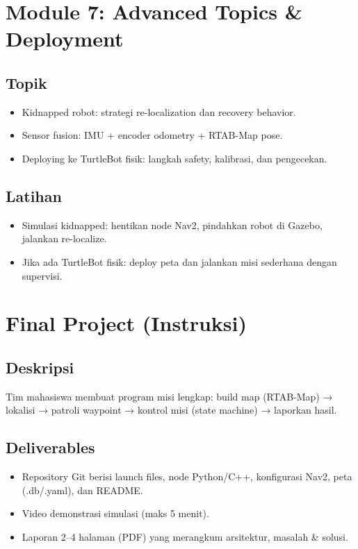 \documentclass[12pt,a4paper]{article}
\begin{document}
\newpage
\section{Module 7: Advanced Topics \& Deployment}
\subsection*{Topik}
\begin{itemize}
    \item Kidnapped robot: strategi re-localization dan recovery behavior.
    \item Sensor fusion: IMU + encoder odometry + RTAB-Map pose.
    \item Deploying ke TurtleBot fisik: langkah safety, kalibrasi, dan pengecekan.
\end{itemize}

\subsection*{Latihan}
\begin{itemize}
    \item Simulasi kidnapped: hentikan node Nav2, pindahkan robot di Gazebo, jalankan re-localize.
    \item Jika ada TurtleBot fisik: deploy peta dan jalankan misi sederhana dengan supervisi.
\end{itemize}

\newpage
\section{Final Project (Instruksi)}
\subsection*{Deskripsi}
Tim mahasiswa membuat program misi lengkap: build map (RTAB-Map) → lokalisi → patroli waypoint → kontrol misi (state machine) → laporkan hasil.

\subsection*{Deliverables}
\begin{itemize}
    \item Repository Git berisi launch files, node Python/C++, konfigurasi Nav2, peta (.db/.yaml), dan README.
    \item Video demonstrasi simulasi (maks 5 menit).
    \item Laporan 2--4 halaman (PDF) yang merangkum arsitektur, masalah & solusi.
\end{itemize}
\end{document}
